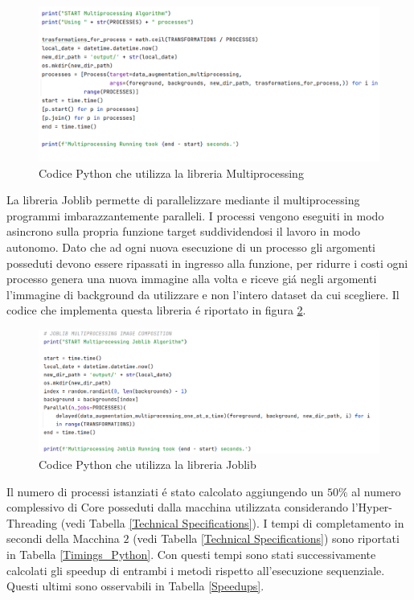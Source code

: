 \documentclass{article}
\begin{document}
\begin{figure}[!h]
\centering
\includegraphics[width= 12.5cm]{"Immagini/Multiprocessing.PNG"}
\caption{Codice Python che utilizza la libreria Multiprocessing}
\label{Multiprocessing}
\end{figure}

\newpage

\noindent La libreria Joblib permette di parallelizzare mediante il multiprocessing programmi imbarazzantemente paralleli. I processi vengono eseguiti in modo asincrono sulla propria funzione target suddividendosi il lavoro in modo autonomo. Dato che ad ogni nuova esecuzione di un processo gli argomenti posseduti devono essere ripassati in ingresso alla funzione, per ridurre i costi ogni processo genera una nuova immagine alla volta e riceve gi\'a negli argomenti l'immagine di background da utilizzare e non l'intero dataset da cui scegliere. Il codice che implementa questa libreria \'e riportato in figura \ref{Joblib}.

\begin{figure}[!h]
\centering
\includegraphics[width= 12.5cm]{"Immagini/Joblib.PNG"}
\caption{Codice Python che utilizza la libreria Joblib}
\label{Joblib}
\end{figure}

\noindent Il numero di processi istanziati \'e stato calcolato aggiungendo un $50\%$ al numero complessivo di Core posseduti dalla macchina utilizzata considerando l’Hyper-Threading (vedi Tabella \ref{Technical Specifications}). I tempi di completamento in secondi della Macchina $ 2 $ (vedi Tabella \ref{Technical Specifications}) sono riportati in Tabella \ref{Timings_Python}. Con questi tempi sono stati successivamente calcolati gli speedup di entrambi i metodi rispetto all'esecuzione sequenziale. Questi ultimi sono osservabili in Tabella \ref{Speedups}.
\end{document}
